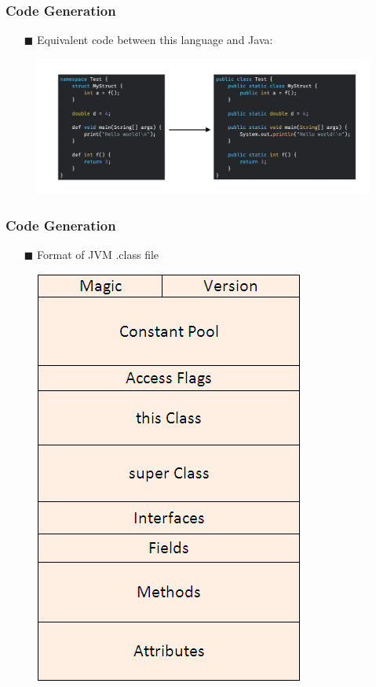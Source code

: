 \documentclass{beamer}
\begin{document}
\begin{frame}
    \frametitle{Code Generation}
        \begin{itemize}
        \item[$\blacksquare$] Equivalent code between this language and Java:
    \end{itemize}
    \begin{figure}[h]
        \centering
        \includegraphics[scale=0.2]{assets/codeConvert.png}
    \end{figure}
\end{frame}

\begin{frame}
    \frametitle{Code Generation}
    \begin{itemize}
        \item[$\blacksquare$] Format of JVM .class file
    \end{itemize}
    \begin{figure}[h]
        \centering
        \includegraphics[scale=0.35]{assets/java-class-file-internal-structure.png}
    \end{figure}
\end{frame}
\end{document}
